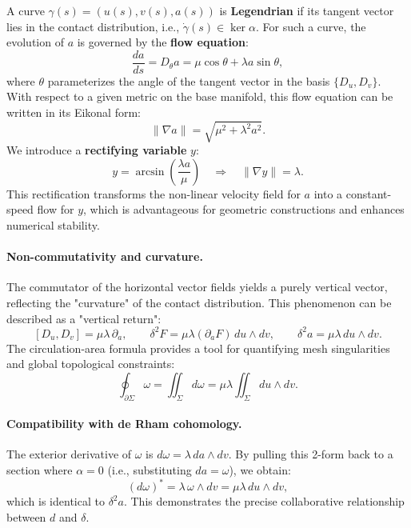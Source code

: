 A curve $\gamma(s) = (u(s), v(s), a(s))$ is \textbf{Legendrian} if its tangent vector lies in the contact distribution, i.e., $\dot\gamma(s) \in \ker\alpha$. For such a curve, the evolution of $a$ is governed by the \textbf{flow equation}:
\begin{equation}\label{eq:4}\tag{4}
\frac{da}{ds} = D_\theta a = \mu\cos\theta + \lambda a\sin\theta,
\end{equation}
where $\theta$ parameterizes the angle of the tangent vector in the basis $\{D_u,D_v\}$. With respect to a given metric on the base manifold, this flow equation can be written in its Eikonal form:
\begin{equation}\label{eq:5}\tag{5}
\|\nabla a\| = \sqrt{\mu^2 + \lambda^2 a^2}.
\end{equation}
We introduce a \textbf{rectifying variable} $y$:
\begin{equation}\label{eq:6}\tag{6}
y = \arcsin\left(\frac{\lambda a}{\mu}\right) \quad\Rightarrow\quad \|\nabla y\| = \lambda.
\end{equation}
This rectification transforms the non-linear velocity field for $a$ into a constant-speed flow for $y$, which is advantageous for geometric constructions and enhances numerical stability.

\paragraph{Non-commutativity and curvature.}
The commutator of the horizontal vector fields yields a purely vertical vector, reflecting the "curvature" of the contact distribution. This phenomenon can be described as a "vertical return":
\begin{equation}\label{eq:7}\tag{7}
[D_u,D_v] = \mu\lambda\,\partial_a,\qquad \delta^2F = \mu\lambda(\partial_a F)\,du\wedge dv,\qquad \delta^2 a = \mu\lambda\,du\wedge dv.
\end{equation}
The circulation-area formula provides a tool for quantifying mesh singularities and global topological constraints:
\begin{equation}\label{eq:8}\tag{8}
\oint_{\partial\Sigma}\omega = \iint_\Sigma d\omega = \mu\lambda\iint_\Sigma du\wedge dv.
\end{equation}

\paragraph{Compatibility with de Rham cohomology.}
The exterior derivative of $\omega$ is $d\omega = \lambda\,da\wedge dv$. By pulling this 2-form back to a section where $\alpha=0$ (i.e., substituting $da=\omega$), we obtain:
\[
(d\omega)^* = \lambda\,\omega\wedge dv = \mu\lambda\,du\wedge dv,
\]
which is identical to $\delta^2 a$. This demonstrates the precise collaborative relationship between $d$ and $\delta$.

